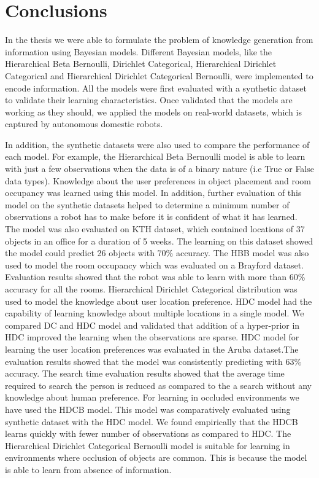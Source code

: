 \chapter{Conclusions}
\label{cha:}
In the thesis we were able to formulate the problem of knowledge generation from information using Bayesian models. Different Bayesian models, like the Hierarchical Beta Bernoulli, Dirichlet Categorical, Hierarchical Dirichlet Categorical and Hierarchical Dirichlet Categorical Bernoulli, were implemented to encode information. All the models were first evaluated with a synthetic dataset to validate their learning characteristics. Once validated that the models are working as they should, we applied the models on real-world datasets, which is captured by autonomous domestic robots. 

In addition, the synthetic datasets were also used to compare the performance of each model. For example, the Hierarchical Beta Bernoulli model is able to learn with just a few observations when the data is of a binary nature (i.e True or False data types). Knowledge about the user preferences in object placement and room occupancy was learned using this model. In addition, further evaluation of this model on the synthetic datasets helped to determine a minimum number of observations a robot has to make before it is confident of what it has learned. The model was also evaluated on KTH dataset, which contained locations of 37 objects in an office for a duration of 5 weeks. The learning on this dataset showed the model could predict 26 objects with 70\% accuracy. The HBB model was also used to model the room occupancy which was evaluated on a Brayford dataset. Evaluation results showed that the robot was able to learn with more than 60\% accuracy for all the rooms. Hierarchical Dirichlet Categorical distribution was used to model the knowledge about user location preference. HDC model had the capability of learning knowledge about multiple locations in a single model. We compared DC and HDC model and validated that addition of a hyper-prior in HDC improved the learning when the observations are sparse. HDC model for learning the user location preferences was evaluated in the Aruba dataset.The evaluation results showed that the model was consistently predicting with 63\% accuracy. The search time evaluation results showed that the average time required to search the person is reduced as compared to the a search without any knowledge about human preference. For learning in occluded environments we have used the HDCB model. This model was comparatively evaluated using synthetic dataset with the HDC model. We found empirically that the HDCB learns quickly with fewer number of observations as compared to HDC. The Hierarchical Dirichlet Categorical Bernoulli model is suitable for learning in environments where occlusion of objects are common. This is because the model is able to learn from absence of information.

